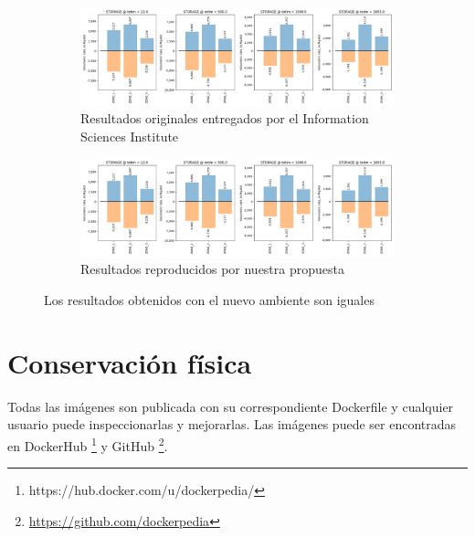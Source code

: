 \begin{figure}[]
    \centering
    \begin{subfigure}[b]{\textwidth}
         \centering
         \includegraphics[width=\textwidth]{Figures/viz-original}
         \caption{Resultados originales entregados por el Information Sciences Institute}
         \label{fig:modflow-original}
     \end{subfigure}
	
	    \begin{subfigure}[b]{\textwidth}
         \centering
         \includegraphics[width=\textwidth]{Figures/viz-reproduced}
         \caption{Resultados reproducidos por nuestra propuesta}
         \label{fig:modflow-reproduced}
     \end{subfigure}
        \caption{Los resultados obtenidos con el nuevo ambiente son iguales}
        \label{fig:both-modflow}
\end{figure}






\section{Conservación física}\label{s5.2}

Todas las imágenes son publicada con su correspondiente Dockerfile y cualquier usuario puede inspeccionarlas y mejorarlas. Las imágenes puede ser encontradas en DockerHub \footnote{https://hub.docker.com/u/dockerpedia/} y GitHub \footnote{\url{https://github.com/dockerpedia}}. 


